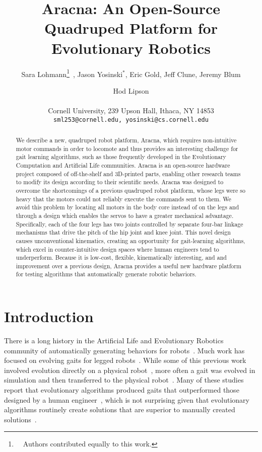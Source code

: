 \documentclass[letterpaper]{article}
\title{Aracna: An Open-Source Quadruped Platform for Evolutionary Robotics}
\author{Sara Lohmann\thanks{~~Authors contributed equally to this work.}~, Jason Yosinski$^{*}$, Eric Gold, Jeff Clune, Jeremy Blum \and Hod Lipson  \\
  \mbox{}\\
Cornell University, 239 Upson Hall, Ithaca, NY 14853 \\
\texttt{sml253@cornell.edu, yosinski@cs.cornell.edu}}
\begin{document}
\maketitle

\begin{abstract}

We describe a new, quadruped robot platform, Aracna, which requires
non-intuitive motor commands in order to locomote and thus provides an
interesting challenge for gait learning algorithms, such as those
frequently developed in the Evolutionary Computation and Artificial
Life communities. Aracna is an open-source hardware project composed
of off-the-shelf and 3D-printed parts, enabling other research teams
to modify its design according to their scientific needs.  Aracna was
designed to overcome the shortcomings of a previous quadruped robot
platform, whose legs were so heavy that the motors could not reliably
execute the commands sent to them. We avoid this problem by
locating all motors in the body core instead of on the legs and
through a design which enables the servos to have a greater mechanical
advantage.  Specifically, each of the four legs has two joints
controlled by separate four-bar linkage mechanisms that
drive the pitch of the hip joint and knee joint.
This novel design causes unconventional kinematics, creating
an opportunity for gait-learning algorithms, which excel in
counter-intuitive design spaces where human engineers tend to
underperform.  Because it is low-cost, flexible, kinematically
interesting, and and improvement over a previous design, Aracna
provides a useful new hardware platform for testing algorithms that
automatically generate robotic behaviors.

\end{abstract}



\section{Introduction}

There is a long history in the Artificial Life and Evolutionary Robotics community of automatically generating behaviors for robots~\citep{nolfi2000evolutionary, pfeifer2007body, sims1994evolving, hornby2005autonomous, lipson2000automatic}. Much work has focused on evolving gaits for legged robots~\citep{clune2009evolving, clune2011performance, hornby2005autonomous, hornby2003generative, kodjabachian1998evolution, Koos2012, bongard2006resilient, yosinski2011gaits, gallagher1996application}. While some of this previous work involved evolution directly on a physical robot~\citep{yosinski2011gaits, zykov2004evolving}, more often a gait was evolved in simulation and then transferred to the physical robot~\citep{lipson2006evolutionary, Koos2012, hornby2005autonomous, bongard2006resilient}. Many of these studies report that evolutionary algorithms produced gaits that outperformed those designed by a human engineer~\citep{yosinski2011gaits, hornby2005autonomous}, which is not surprising given that evolutionary algorithms routinely create solutions that are superior to manually created solutions~\citep{koza2003genetic}. 
\end{document}
